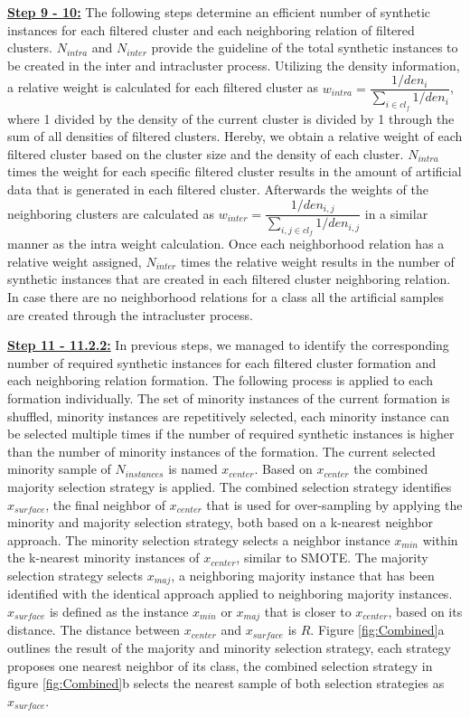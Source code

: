 \documentclass[parskip=full]{scrartcl}
\begin{document}
\textbf{\underline{Step 9 - 10:}} The following steps determine an efficient number of synthetic instances for each filtered cluster and each neighboring relation of filtered clusters. $N_{intra}$ and $N_{inter}$ provide the guideline of the total synthetic instances to be created in the inter and intracluster process.  Utilizing the density information, a relative weight is calculated for each filtered cluster as $w_{intra} = \dfrac{1 / den_{i}}{\sum_{i \in cl_{f}} 1/den_{i}}$, where 1 divided by the density of the current cluster is divided by 1 through the sum of all densities of filtered clusters. Hereby, we obtain a relative weight of each filtered cluster based on the cluster size and the density of each cluster. $N_{intra}$ times the weight for each specific filtered cluster results in the amount of artificial data that is generated in each filtered cluster. Afterwards the weights of the neighboring clusters are calculated as $w_{inter} = \dfrac{1 / den_{i,j}}{\sum_{i,j \in cl_{f}} 1/den_{i,j}}$ in a similar manner as the intra weight calculation. Once each neighborhood relation has a relative weight assigned, $N_{inter}$ times the relative weight results in the number of synthetic instances that are created in each filtered cluster neighboring relation. In case there are no neighborhood relations for a class all the artificial samples are created through the intracluster process. 

\textbf{\underline{Step 11 - 11.2.2:}}  In previous steps, we managed to identify the corresponding number of required synthetic instances for each filtered cluster formation and each neighboring relation formation. The following process is applied to each formation individually. The set of minority instances of the current formation is shuffled, minority instances are repetitively selected, each minority instance can be selected multiple times if the number of required synthetic instances is higher than the number of minority instances of the formation. The current selected minority sample of $N_{instances}$ is named  $x_{center}$. Based on $x_{center}$ the combined majority selection strategy is applied. The combined selection strategy identifies $x_{surface}$, the final neighbor of $x_{center}$ that is used for over-sampling by applying the minority and majority selection strategy, both based on a k-nearest neighbor approach. The minority selection strategy selects a neighbor instance $x_{min}$ within the k-nearest minority instances of $x_{center}$, similar to SMOTE. The majority selection strategy selects $x_{maj}$, a neighboring majority instance that has been identified with the identical approach applied to neighboring majority instances. $x_{surface}$ is defined as the instance $x_{min}$ or $x_{maj}$ that is closer to $x_{center}$, based on its distance. The distance between $x_{center}$ and $x_{surface}$ is $R$. Figure \ref{fig:Combined}a outlines the result of the majority and minority selection strategy, each strategy proposes one nearest neighbor of its class, the combined selection strategy in figure \ref{fig:Combined}b selects the nearest sample of both selection strategies as $x_{surface}$.
\end{document}
